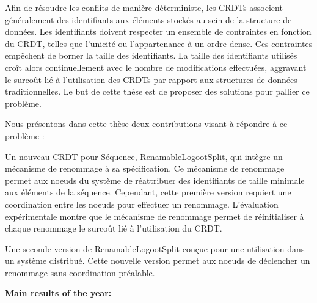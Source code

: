 \documentclass[12pt]{article}
\begin{document}
Afin de résoudre les conflits de manière déterministe, les CRDTs associent généralement des identifiants aux éléments stockés au sein de la structure de données.
Les identifiants doivent respecter un ensemble de contraintes en fonction du CRDT, telles que l'unicité ou l'appartenance à un ordre dense.
Ces contraintes empêchent de borner la taille des identifiants.
La taille des identifiants utilisés croît alors continuellement avec le nombre de modifications effectuées, aggravant le surcoût lié à l'utilisation des CRDTs par rapport aux structures de données traditionnelles.
Le but de cette thèse est de proposer des solutions pour pallier ce problème.

Nous présentons dans cette thèse deux contributions visant à répondre à ce problème :
\begin{enumerate*}[label=(\roman*)]
    \item Un nouveau CRDT pour Séquence, RenamableLogootSplit, qui intègre un mécanisme de renommage à sa spécification.
    Ce mécanisme de renommage permet aux noeuds du système de réattribuer des identifiants de taille minimale aux éléments de la séquence.
    Cependant, cette première version requiert une coordination entre les noeuds pour effectuer un renommage.
    L'évaluation expérimentale montre que le mécanisme de renommage permet de réinitialiser à chaque renommage le surcoût lié à l'utilisation du CRDT.
    \item Une seconde version de RenamableLogootSplit conçue pour une utilisation dans un système distribué.
    Cette nouvelle version permet aux noeuds de déclencher un renommage sans coordination préalable.
\end{enumerate*}

\noindent\textbf{Main results of the year:}


\end{document}
